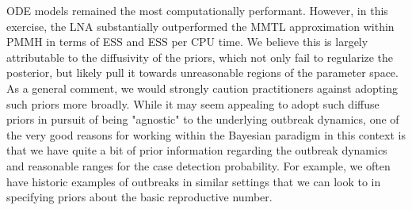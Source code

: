 ODE models remained the most computationally performant. However, in this exercise, the LNA substantially outperformed the MMTL approximation within PMMH in terms of ESS and ESS per CPU time. We believe this is largely attributable to the diffusivity of the priors, which not only fail to regularize the posterior, but likely pull it towards unreasonable regions of the parameter space. As a general comment, we would strongly caution practitioners against adopting such priors more broadly. While it may seem appealing to adopt such diffuse priors in pursuit of being "agnostic" to the underlying outbreak dynamics, one of the very good reasons for working within the Bayesian paradigm in this context is that we have quite a bit of prior information regarding the outbreak dynamics and reasonable ranges for the case detection probability. For example, we often have historic examples of outbreaks in similar settings that we can look to in specifying priors about the basic reproductive number.

